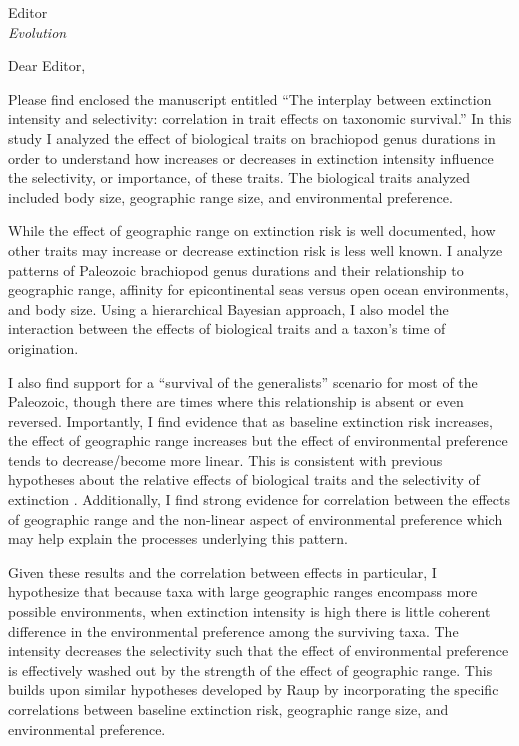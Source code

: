 \documentclass{letter}
\begin{document}
\begin{letter}{Editor \\ \textit{Evolution}}
  \opening{Dear Editor,}

  Please find enclosed the manuscript entitled ``The interplay between extinction intensity and selectivity: correlation in trait effects on taxonomic survival.'' In this study I analyzed the effect of biological traits on brachiopod genus durations in order to understand how increases or decreases in extinction intensity influence the selectivity, or importance, of these traits. The biological traits analyzed included body size, geographic range size, and environmental preference.
  
  While the effect of geographic range on extinction risk is well documented, how other traits may increase or decrease extinction risk is less well known. I analyze patterns of Paleozoic brachiopod genus durations and their relationship to geographic range, affinity for epicontinental seas versus open ocean environments, and body size. Using a hierarchical Bayesian approach, I also model the interaction between the effects of biological traits and a taxon's time of origination. 

  I also find support for a ``survival of the generalists'' scenario for most of the Paleozoic, though there are times where this relationship is absent or even reversed. Importantly, I find evidence that as baseline extinction risk increases, the effect of geographic range increases but the effect of environmental preference tends to decrease/become more linear. This is consistent with previous hypotheses about the relative effects of biological traits and the selectivity of extinction \cite{Jablonski1987,Raup1991b}. Additionally, I find strong evidence for correlation between the effects of geographic range and the non-linear aspect of environmental preference which may help explain the processes underlying this pattern. 
  
  Given these results and the correlation between effects in particular, I hypothesize that because taxa with large geographic ranges encompass more possible environments, when extinction intensity is high there is little coherent difference in the environmental preference among the surviving taxa. The intensity decreases the selectivity such that the effect of environmental preference is effectively washed out by the strength of the effect of geographic range. This builds upon similar hypotheses developed by Raup \cite{Raup1991b,Raup1994} by incorporating the specific correlations between baseline extinction risk, geographic range size, and environmental preference.
  

\end{letter}
\end{document}

